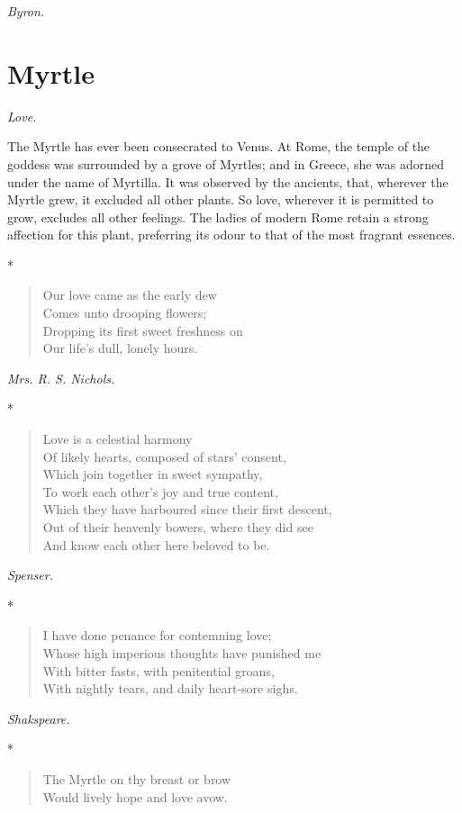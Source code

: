\documentclass[11pt,twoside]{article}
\newcommand\flower[2]{\section*{#1}\addcontentsline{toc}{section}{#1}%
  \noindent\textit{#2.}\par\medskip}
\newcommand\stars{\begin{center}*\quad*\quad*\end{center}}
\newcommand\by[1]{\par\hfill\textit{#1}\par}
\begin{document}
\by{Byron.}

\flower{Myrtle}{Love}

The Myrtle has ever been consecrated to Venus. At Rome, the temple of the goddess was surrounded by a grove of Myrtles; and in Greece, she was adorned under the name of Myrtilla. It was observed by the ancients, that, wherever the Myrtle grew, it excluded all other plants. So love, wherever it is permitted to grow, excludes all other feelings. The ladies of modern Rome retain a strong affection for this plant, preferring its odour to that of the most fragrant essences.

\stars

\begin{verse}
Our love came as the early dew\\
\quad Comes unto drooping flowers;\\
Dropping its first sweet freshness on\\
\quad Our life’s dull, lonely hours.
\end{verse}

\by{Mrs. R. S. Nichols.}

\stars

\begin{verse}
\quad Love is a celestial harmony\\
Of likely hearts, composed of stars’ consent,\\
Which join together in sweet sympathy,\\
To work each other’s joy and true content,\\
Which they have harboured since their first descent,\\
Out of their heavenly bowers, where they did see\\
And know each other here beloved to be.
\end{verse}

\by{Spenser.}

\stars

\begin{verse}
I have done penance for contemning love;\\
Whose high imperious thoughts have punished me\\
With bitter fasts, with penitential groans,\\
With nightly tears, and daily heart-sore sighs.
\end{verse}

\by{Shakspeare.}

\stars

\begin{verse}
The Myrtle on thy breast or brow\\
Would lively hope and love avow.
\end{verse}
\end{document}
